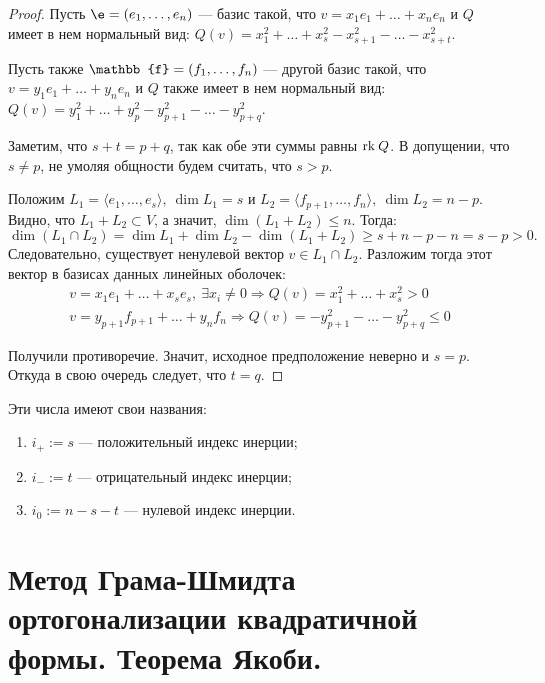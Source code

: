 \begin{proof}
Пусть $\e = \vector{e}$ --- базис такой, что $v = x_1e_1 + \ldots + x_ne_n$ и $Q$ имеет в нем нормальный вид: $Q(v) = x_1^2 + \ldots + x_s^2 - x_{s + 1}^2 - \ldots - x_{s + t}^2$. 

Пусть также $\mathbb{f} = \vector{f}$ --- другой базис такой, что $v = y_1e_1 + \ldots + y_ne_n$ и $Q$ также имеет в нем нормальный вид: $Q(v) = y_1^2 + \ldots + y_p^2 - y_{p + 1}^2 - \ldots - y_{p + q}^2$.

Заметим, что $s + t = p + q$, так как обе эти суммы равны $\mathrm{rk}\: Q$. В допущении, что $s \neq p$, не умоляя общности будем считать, что $s > p$.

Положим $L_1 = \langle e_1, \ldots, e_s \rangle,\ \dim L_1 = s$ и $L_2 = \langle f_{p + 1}, \ldots, f_{n}\rangle,\ \dim L_2 = n - p$. Видно, что $L_1 + L_2 \subset V$, а значит, $\dim(L_1 + L_2) \leqslant n$. Тогда:
$$
\dim(L_1 \cap L_2) = \dim L_1 + \dim L_2 - \dim(L_1 + L_2) \geqslant s + n - p - n = s - p > 0.
$$
Следовательно, существует ненулевой вектор $v \in L_1 \cap L_2$. Разложим тогда этот вектор в базисах данных линейных оболочек:
\begin{gather*}
v = x_1e_1 + \ldots + x_se_s,\ \exists x_i \neq 0 \Rightarrow Q(v) = x_1^2 + \ldots + x_s^2 >0 \\
v = y_{p + 1}f_{p + 1} + \ldots + y_nf_n \Rightarrow Q(v) = -y_{p+1}^2 - \ldots - y_{p + q}^2 \leqslant 0
\end{gather*}

Получили противоречие. Значит, исходное предположение неверно и $s = p$. Откуда в свою очередь следует, что $t = q$.
\end{proof}

\begin{Def}
Эти числа имеют свои названия:
\begin{enumerate}
\item $i_+ := s$ --- положительный индекс инерции;
\item $i_- := t$ --- отрицательный индекс инерции;
\item $i_0 := n - s - t$ --- нулевой индекс инерции.
\end{enumerate}
\end{Def}

\section{Метод Грама-Шмидта ортогонализации квадратичной формы. Теорема Якоби.}

